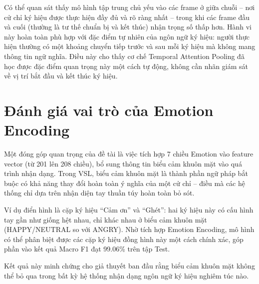 Có thể quan sát thấy mô hình tập trung chủ yếu vào các frame ở giữa chuỗi --
nơi cử chỉ ký hiệu được thực hiện đầy đủ và rõ ràng nhất -- trong khi các frame
đầu và cuối (thường là tư thế chuẩn bị và kết thúc) nhận trọng số thấp hơn.
Hành vi này hoàn toàn phù hợp với đặc điểm tự nhiên của ngôn ngữ ký hiệu: người
thực hiện thường có một khoảng chuyển tiếp trước và sau mỗi ký hiệu mà không
mang thông tin ngữ nghĩa. Điều này cho thấy cơ chế Temporal Attention Pooling
đã học được đặc điểm quan trọng này một cách tự động, không cần nhãn giám sát
về vị trí bắt đầu và kết thúc ký hiệu.

\section{Đánh giá vai trò của Emotion Encoding}

Một đóng góp quan trọng của đề tài là việc tích hợp 7 chiều Emotion vào feature
vector (từ 201 lên 208 chiều), bổ sung thông tin biểu cảm khuôn mặt vào quá
trình nhận dạng. Trong VSL, biểu cảm khuôn mặt là thành phần ngữ pháp bắt buộc
có khả năng thay đổi hoàn toàn ý nghĩa của một cử chỉ -- điều mà các hệ thống
chỉ dựa trên nhận diện tay thuần túy hoàn toàn bỏ sót.

Ví dụ điển hình là cặp ký hiệu ``Cảm ơn'' và ``Ghét'': hai ký hiệu này có cấu
hình tay gần như giống hệt nhau, chỉ khác nhau ở biểu cảm khuôn mặt
(HAPPY/NEUTRAL so với ANGRY). Nhờ tích hợp Emotion Encoding, mô hình có thể
phân biệt được các cặp ký hiệu đồng hình này một cách chính xác, góp phần vào
kết quả Macro F1 đạt 99.06\% trên tập Test.

Kết quả này minh chứng cho giả thuyết ban đầu rằng biểu cảm khuôn mặt không
thể bỏ qua trong bất kỳ hệ thống nhận dạng ngôn ngữ ký hiệu nghiêm túc nào.
